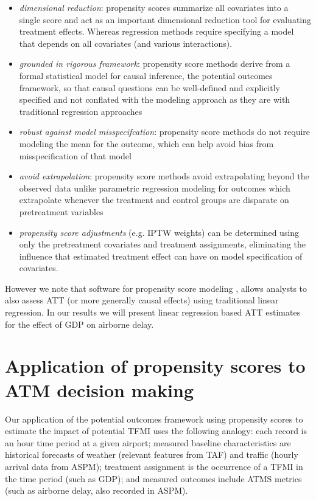 \documentclass[11pt]{scrartcl}
\begin{document}
\begin{itemize}
\item \emph{dimensional reduction}: propensity scores summarize all covariates into a single score and act as an important dimensional reduction tool for evaluating treatment effects. Whereas regression methods require specifying a model that depends on all covariates (and various interactions).

\item  \emph{grounded in rigorous framework}: propensity score methods derive from a formal statistical model for causal inference, the potential outcomes framework, so that causal questions can be well-defined and explicitly specified and not conflated with the modeling approach as they are with traditional regression approaches

\item  \emph{robust against model misspecifcation}: propensity score methods do not require modeling the mean for the outcome, which can help avoid bias from misspecification of that model 

\item \emph{avoid extrapolation}: propensity score methods avoid extrapolating beyond the observed data unlike parametric regression modeling for outcomes which extrapolate whenever the treatment and control groups are disparate on pretreatment variables

\item \emph{propensity score adjustments} (e.g. IPTW weights) can be determined using only the pretreatment covariates and treatment assignments, eliminating the influence that estimated treatment effect can have on model specification of covariates.
\end{itemize}

However we note that software for propensity score modeling \cite{ridgeway2015toolkit}, allows analysts to also assess ATT (or more generally causal effects) using traditional linear regression.  In our results we will present linear regression based ATT estimates for the effect of GDP on airborne delay.  

\section*{Application of propensity scores to ATM decision making}
Our application of the potential outcomes framework using propensity scores to estimate the impact of potential TFMI uses the following analogy: each record is an hour time period at a given airport; measured baseline characteristics are historical forecasts of weather (relevant features from TAF) and traffic (hourly arrival data from ASPM); treatment assignment is the occurrence of a TFMI in the time period (such as GDP); and measured outcomes include ATMS metrics (such as airborne delay, also recorded in ASPM).  
\end{document}
